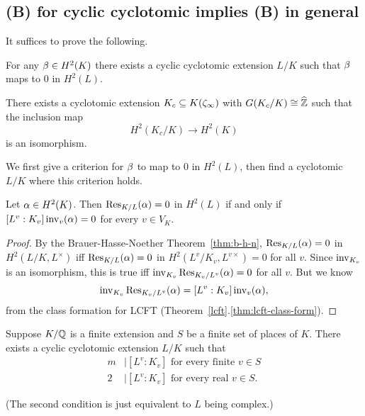 \subsection{(B) for cyclic cyclotomic implies (B) in general}
It suffices to prove the following.
\begin{thm}
For any $\beta\in H^2(K)$ there exists a cyclic cyclotomic extension $L/K$ such that $\beta$ maps to 0 in $H^2(L)$.

There exists a cyclotomic extension $K_c\subseteq K(\zeta_{\infty})$ with $G(K_c/K)\cong \widehat{\mathbb{Z}}$ such that the inclusion map
\[
H^2(K_c/K)\to H^2(K)
\]
is an isomorphism.
\end{thm}
We first give a criterion for $\beta$ to map to 0 in $H^2(L)$, then find a cyclotomic $L/K$ where this criterion holds.
\begin{lem}
Let $\alpha \in H^2(K)$. Then $\operatorname{Res}_{K/L}(\alpha)=0$ in $H^2(L)$ if and only if $[L^v:K_v]\operatorname{inv}_v(\alpha)=0$ for every $v\in V_K$. 
\end{lem}
\begin{proof}
By the Brauer-Hasse-Noether Theorem~\ref{thm:b-h-n}, $\operatorname{Res}_{K/L}(\alpha)=0$ in $H^2(L/K, L^{\times})$ iff $\operatorname{Res}_{K/L}(\alpha)=0$ in $H^2(L^v/K_v,L^{v\times})=0$ for all $v$. Since $\operatorname{inv}_{K_v}$ is an isomorphism, this is true iff $\operatorname{inv}_{K_v}\operatorname{Res}_{K_v/L^v}(\alpha)=0$ for all $v$. But we know 
\[\operatorname{inv}_{K_v}\operatorname{Res}_{K_v/L^v}(\alpha)=[L^v:K_v]\operatorname{inv}_v(\alpha),\]
from the class formation for LCFT (Theorem~\ref{lcft}.\ref{thm:lcft-class-form}).
\end{proof}
\begin{lem}
Suppose $K/\mathbb{Q}$ is a finite extension and $S$ be a finite set of places of $K$. 
There exists a cyclic cyclotomic extension $L/K$ such that
\begin{align*}
m&\mid [L^v:K_v]\text{ for every finite }v\in S\\
2&\mid [L^v:K_v]\text{ for every real }v\in S.
\end{align*}
\end{lem}
(The second condition is just equivalent to $L$ being complex.)
